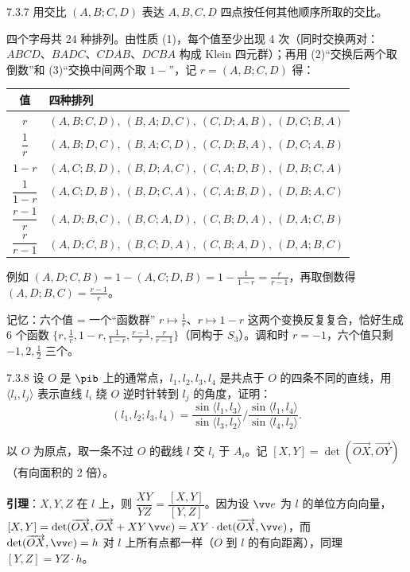 \begin{ex}{7.3.7}
用交比 $(A,B;C,D)$ 表达 $A,B,C,D$ 四点按任何其他顺序所取的交比。
\end{ex}
\jie 四个字母共 $24$ 种排列。由性质 (1)，每个值至少出现 4 次（同时交换两对：$ABCD$、$BADC$、$CDAB$、$DCBA$ 构成 Klein 四元群）；再用 (2)“交换后两个取倒数”和 (3)“交换中间两个取 $1-$”，记 $r=(A,B;C,D)$ 得：
\begin{center}
\renewcommand{\arraystretch}{1.3}
\begin{tabular}{cl}
\toprule
值 & 四种排列\\\midrule
$r$ & $(A,B;C,D),\ (B,A;D,C),\ (C,D;A,B),\ (D,C;B,A)$\\
$\dfrac1r$ & $(A,B;D,C),\ (B,A;C,D),\ (C,D;B,A),\ (D,C;A,B)$\\
$1-r$ & $(A,C;B,D),\ (B,D;A,C),\ (C,A;D,B),\ (D,B;C,A)$\\
$\dfrac1{1-r}$ & $(A,C;D,B),\ (B,D;C,A),\ (C,A;B,D),\ (D,B;A,C)$\\
$\dfrac{r-1}{r}$ & $(A,D;B,C),\ (B,C;A,D),\ (C,B;D,A),\ (D,A;C,B)$\\
$\dfrac{r}{r-1}$ & $(A,D;C,B),\ (B,C;D,A),\ (C,B;A,D),\ (D,A;B,C)$\\\bottomrule
\end{tabular}
\end{center}
例如 $(A,D;C,B)=1-(A,C;D,B)=1-\frac1{1-r}=\frac{r}{r-1}$，再取倒数得 $(A,D;B,C)=\frac{r-1}r$。

\begin{intbox}{记忆：六个值 = 一个“函数群”}
$r\mapsto\frac1r$、$r\mapsto1-r$ 这两个变换反复复合，恰好生成 6 个函数 $\{r,\frac1r,1-r,\frac1{1-r},\frac{r-1}r,\frac r{r-1}\}$（同构于 $S_3$）。调和时 $r=-1$，六个值只剩 $-1,2,\frac12$ 三个。
\end{intbox}

\begin{ex}{7.3.8}
设 $O$ 是 $\pib$ 上的通常点，$l_1,l_2,l_3,l_4$ 是共点于 $O$ 的四条不同的直线，用 $\langle l_i,l_j\rangle$ 表示直线 $l_i$ 绕 $O$ 逆时针转到 $l_j$ 的角度，证明：
\[
(l_1,l_2;l_3,l_4)=\frac{\sin\langle l_1,l_3\rangle}{\sin\langle l_3,l_2\rangle}\Big/\frac{\sin\langle l_1,l_4\rangle}{\sin\langle l_4,l_2\rangle}.
\]
\end{ex}
\zheng 以 $O$ 为原点，取一条不过 $O$ 的截线 $l$ 交 $l_i$ 于 $A_i$。记 $[X,Y]=\det(\overrightarrow{OX},\overrightarrow{OY})$（有向面积的 2 倍）。

\textbf{引理}：$X,Y,Z$ 在 $l$ 上，则 $\dfrac{XY}{YZ}=\dfrac{[X,Y]}{[Y,Z]}$。因为设 $\vv e$ 为 $l$ 的单位方向向量，$[X,Y]=\det(\overrightarrow{OX},\overrightarrow{OX}+XY\,\vv e)=XY\cdot\det(\overrightarrow{OX},\vv e)$，而 $\det(\overrightarrow{OX},\vv e)=h$ 对 $l$ 上所有点都一样（$O$ 到 $l$ 的有向距离），同理 $[Y,Z]=YZ\cdot h$。

